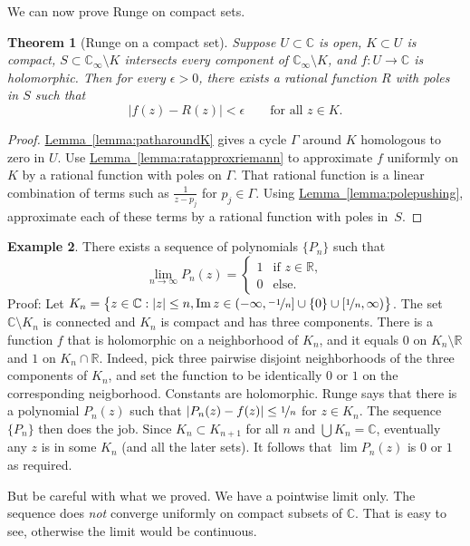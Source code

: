 \documentclass[12pt,openany]{book}
\renewcommand{\Im}{\operatorname{Im}}
\newcommand{\sabs}[1]{\lvert {#1} \rvert}
\newcommand{\abs}[1]{\left\lvert {#1} \right\rvert}
\newcommand{\C}{{\mathbb{C}}}
\newcommand{\R}{{\mathbb{R}}}
\theoremstyle{plain}
\newtheorem{thm}{Theorem}[section]
\theoremstyle{remark}
\theoremstyle{definition}
\theoremstyle{exercise}
\theoremstyle{example}
\newtheorem{example}[thm]{Example}
\newcommand{\lemmaref}[1]{\hyperref[#1]{Lemma~\ref*{#1}}}
\begin{document}
We can now prove Runge on compact sets.

\begin{thm}[Runge on a compact set]%
\label{thm:rungecpt}
Suppose $U \subset \C$ is open, $K \subset U$ is compact, $S \subset \C_{\infty} \setminus K$
intersects every component of $\C_\infty \setminus K$,
and $f \colon U \to \C$ is holomorphic.
Then for every $\epsilon > 0$,
there exists a rational function $R$ with poles in $S$ such that
\begin{equation*}
\abs{f(z)-R(z)} < \epsilon \qquad \text{for all $z \in K$.}
\end{equation*}
\end{thm}

\begin{proof}
\lemmaref{lemma:patharoundK} gives a cycle $\Gamma$
around $K$ homologous
to zero in $U$.  Use \lemmaref{lemma:ratapproxriemann} to approximate
$f$ uniformly on $K$ by a rational function with poles on $\Gamma$.
That rational function is a linear combination of
terms such as $\frac{1}{z-p_j}$ for $p_j \in \Gamma$.
Using \lemmaref{lemma:polepushing}, approximate each of these terms
by a rational function with poles in~$S$.
\end{proof}

\begin{example}
There exists a sequence of polynomials $\{ P_n \}$ such that
\begin{equation*}
\lim_{n \to \infty} P_n(z)
=
\begin{cases}
1 & \text{if } z \in \R, \\
0 & \text{else.}
\end{cases}
\end{equation*}
Proof: Let $K_n = \bigl\{ z \in \C : \sabs{z} \leq n, \Im z \in
(-\infty,\nicefrac{-1}{n}] \cup \{ 0 \} \cup
[\nicefrac{1}{n},\infty) \bigr\}$.  The set $\C \setminus K_n$ is connected and
$K_n$ is compact and has three components.  There is a function $f$
that is holomorphic on a neighborhood of $K_n$, and it equals $0$ on $K_n \setminus \R$
and $1$ on $K_n \cap \R$.
Indeed, pick three pairwise disjoint neighborhoods of the three components of
$K_n$, and set the function to be identically $0$ or $1$ on the corresponding
neigborhood.  Constants are holomorphic.
Runge says that there is a polynomial $P_n(z)$ such that $\sabs{P_n(z)-f(z)}
\leq \nicefrac{1}{n}$ for $z \in K_n$.  The sequence $\{ P_n \}$ then does
the job.  Since $K_n \subset K_{n+1}$ for all $n$ and $\bigcup K_n = \C$,
eventually any $z$ is in some $K_n$ (and all the later sets).
It follows that $\lim P_n(z)$ is $0$ or $1$ as required.

But be careful with what we proved.  We have a pointwise limit only.  The sequence
does \emph{not} converge uniformly on compact subsets of $\C$.  That is easy to see,
otherwise the limit would be continuous.
\end{example}
\end{document}
